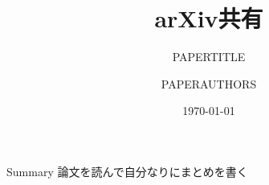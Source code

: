 \documentclass[aspectratio=169, dvipdfmx, 11pt]{beamer} %
\title[arXiv共有]{arXiv共有}
\subtitle{PAPERTITLE}
\author[PAPERAUTHORS]{PAPERAUTHORS}
\institute[PAPERURL]{PAPERURL}
\date{\today}
\begin{document}
\maketitle





\begin{frame}{Summary}
    論文を読んで自分なりにまとめを書く
\end{frame}
\end{document}
